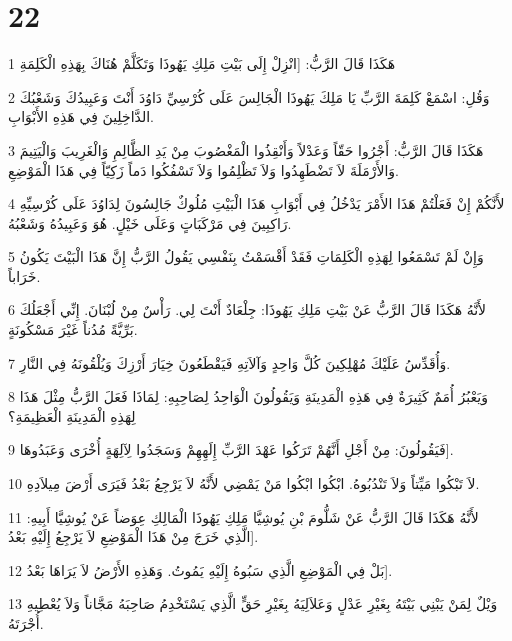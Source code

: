 \chapter{22}

\par 1 هَكَذَا قَالَ الرَّبُّ: [انْزِلْ إِلَى بَيْتِ مَلِكِ يَهُوذَا وَتَكَلَّمْ هُنَاكَ بِهَذِهِ الْكَلِمَةِ
\par 2 وَقُلِ: اسْمَعْ كَلِمَةَ الرَّبِّ يَا مَلِكَ يَهُوذَا الْجَالِسَ عَلَى كُرْسِيِّ دَاوُدَ أَنْتَ وَعَبِيدُكَ وَشَعْبُكَ الدَّاخِلِينَ فِي هَذِهِ الأَبْوَابِ.
\par 3 هَكَذَا قَالَ الرَّبُّ: أَجْرُوا حَقّاً وَعَدْلاً وَأَنْقِذُوا الْمَغْصُوبَ مِنْ يَدِ الظَّالِمِ وَالْغَرِيبَ وَالْيَتِيمَ وَالأَرْمَلَةَ لاَ تَضْطَهِدُوا وَلاَ تَظْلِمُوا وَلاَ تَسْفُكُوا دَماً زَكِيّاً فِي هَذَا الْمَوْضِعِ.
\par 4 لأَنَّكُمْ إِنْ فَعَلْتُمْ هَذَا الأَمْرَ يَدْخُلُ فِي أَبْوَابِ هَذَا الْبَيْتِ مُلُوكٌ جَالِسُونَ لِدَاوُدَ عَلَى كُرْسِيِّهِ رَاكِبِينَ فِي مَرْكَبَاتٍ وَعَلَى خَيْلٍ. هُوَ وَعَبِيدُهُ وَشَعْبُهُ.
\par 5 وَإِنْ لَمْ تَسْمَعُوا لِهَذِهِ الْكَلِمَاتِ فَقَدْ أَقْسَمْتُ بِنَفْسِي يَقُولُ الرَّبُّ إِنَّ هَذَا الْبَيْتَ يَكُونُ خَرَاباً.
\par 6 لأَنَّهُ هَكَذَا قَالَ الرَّبُّ عَنْ بَيْتِ مَلِكِ يَهُوذَا: جِلْعَادٌ أَنْتَ لِي. رَأْسٌ مِنْ لُبْنَانَ. إِنِّي أَجْعَلُكَ بَرِّيَّةً مُدُناً غَيْرَ مَسْكُونَةٍ.
\par 7 وَأُقَدِّسُ عَلَيْكَ مُهْلِكِينَ كُلَّ وَاحِدٍ وَآلاَتِهِ فَيَقْطَعُونَ خِيَارَ أَرْزِكَ وَيُلْقُونَهُ فِي النَّارِ.
\par 8 وَيَعْبُرُ أُمَمٌ كَثِيرَةٌ فِي هَذِهِ الْمَدِينَةِ وَيَقُولُونَ الْوَاحِدُ لِصَاحِبِهِ: لِمَاذَا فَعَلَ الرَّبُّ مِثْلَ هَذَا لِهَذِهِ الْمَدِينَةِ الْعَظِيمَةِ؟
\par 9 فَيَقُولُونَ: مِنْ أَجْلِ أَنَّهُمْ تَرَكُوا عَهْدَ الرَّبِّ إِلَهِهِمْ وَسَجَدُوا لِآلِهَةٍ أُخْرَى وَعَبَدُوهَا].
\par 10 لاَ تَبْكُوا مَيِّتاً وَلاَ تَنْدُبُوهُ. ابْكُوا ابْكُوا مَنْ يَمْضِي لأَنَّهُ لاَ يَرْجِعُ بَعْدُ فَيَرَى أَرْضَ مِيلاَدِهِ.
\par 11 لأَنَّهُ هَكَذَا قَالَ الرَّبُّ عَنْ شَلُّومَ بْنِ يُوشِيَّا مَلِكِ يَهُوذَا الْمَالِكِ عِوَضاً عَنْ يُوشِيَّا أَبِيهِ: [الَّذِي خَرَجَ مِنْ هَذَا الْمَوْضِعِ لاَ يَرْجِعُ إِلَيْهِ بَعْدُ.
\par 12 بَلْ فِي الْمَوْضِعِ الَّذِي سَبُوهُ إِلَيْهِ يَمُوتُ. وَهَذِهِ الأَرْضُ لاَ يَرَاهَا بَعْدُ].
\par 13 وَيْلٌ لِمَنْ يَبْنِي بَيْتَهُ بِغَيْرِ عَدْلٍ وَعَلاَلِيَهُ بِغَيْرِ حَقٍّ الَّذِي يَسْتَخْدِمُ صَاحِبَهُ مَجَّاناً وَلاَ يُعْطِيهِ أُجْرَتَهُ.
